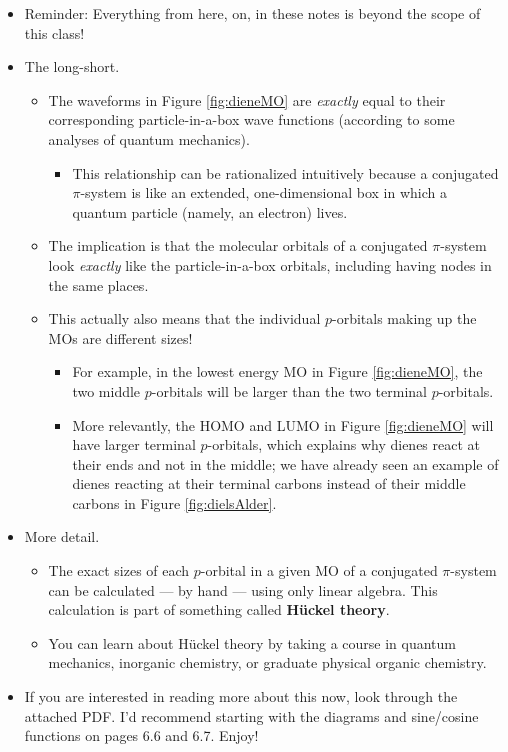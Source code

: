 \documentclass[../notes.tex]{subfiles}
\begin{document}
\begin{itemize}
    \begin{itemize}
        \item Reminder: Everything from here, on, in these notes is beyond the scope of this class!
        \item The long-short.
        \begin{itemize}
            \item The waveforms in Figure \ref{fig:dieneMO} are \emph{exactly} equal to their corresponding particle-in-a-box wave functions (according to some analyses of quantum mechanics).
            \begin{itemize}
                \item This relationship can be rationalized intuitively because a conjugated $\pi$-system is like an extended, one-dimensional box in which a quantum particle (namely, an electron) lives.
            \end{itemize}
            \item The implication is that the molecular orbitals of a conjugated $\pi$-system look \emph{exactly} like the particle-in-a-box orbitals, including having nodes in the same places.
            \item This actually also means that the individual $p$-orbitals making up the MOs are different sizes!
            \begin{itemize}
                \item For example, in the lowest energy MO in Figure \ref{fig:dieneMO}, the two middle $p$-orbitals will be larger than the two terminal $p$-orbitals.
                \item More relevantly, the HOMO and LUMO in Figure \ref{fig:dieneMO} will have larger terminal $p$-orbitals, which explains why dienes react at their ends and not in the middle; we have already seen an example of dienes reacting at their terminal carbons instead of their middle carbons in Figure \ref{fig:dielsAlder}.
            \end{itemize}
        \end{itemize}
        \item More detail.
        \begin{itemize}
            \item The exact sizes of each $p$-orbital in a given MO of a conjugated $\pi$-system can be calculated --- by hand --- using only linear algebra. This calculation is part of something called \textbf{H\"{u}ckel theory}.
            \item You can learn about H\"{u}ckel theory by taking a course in quantum mechanics, inorganic chemistry, or graduate physical organic chemistry.
        \end{itemize}
        \item If you are interested in reading more about this now, look through the attached PDF. I'd recommend starting with the diagrams and sine/cosine functions on pages 6.6 and 6.7. Enjoy!
    \end{itemize}
\end{itemize}
\end{document}
